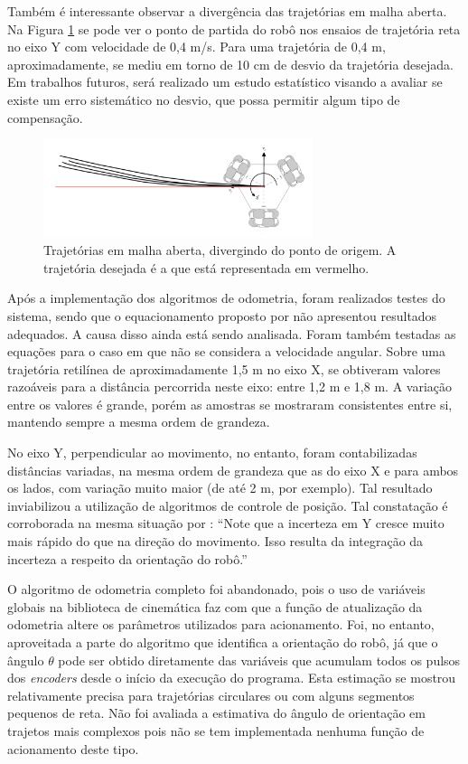 Também é interessante observar a divergência das trajetórias em malha aberta. Na Figura \ref{fig:traj_y} se pode ver o ponto de partida do robô nos ensaios de trajetória reta no eixo Y com velocidade de 0,4 m/s. Para uma trajetória de 0,4 m, aproximadamente, se mediu em torno de 10 cm de desvio da trajetória desejada. Em trabalhos futuros, será realizado um estudo estatístico visando a avaliar se existe um erro sistemático no desvio, que possa permitir algum tipo de compensação.

\begin{figure}[h]
  \centering
  \includegraphics[width = 0.7\textwidth]{imagens/traj_y}
  \caption{Trajetórias em malha aberta, divergindo do ponto de origem. A trajetória desejada é a que está representada em vermelho.}
  \label{fig:traj_y}
\end{figure}

Após a implementação dos algoritmos de odometria, foram realizados testes do sistema, sendo que o equacionamento proposto por \citet{lynch2017modern} não apresentou resultados adequados. A causa disso ainda está sendo analisada. Foram também testadas as equações para o caso em que não se considera a velocidade angular. Sobre uma trajetória retilínea de aproximadamente 1,5 m no eixo X, se obtiveram valores razoáveis para a distância percorrida neste eixo: entre 1,2 m e 1,8 m. A variação entre os valores é grande, porém as amostras se mostraram consistentes entre si, mantendo sempre a mesma ordem de grandeza.

No eixo Y, perpendicular ao movimento, no entanto, foram contabilizadas distâncias variadas, na mesma ordem de grandeza que as do eixo X e para ambos os lados, com variação muito maior (de até 2 m, por exemplo). Tal resultado inviabilizou a utilização de algoritmos de controle de posição. Tal constatação é corroborada na mesma situação por \citet{siegwart2011introduction}: ``Note que a incerteza em Y cresce muito mais rápido do que na direção do movimento. Isso resulta da integração da incerteza a respeito da orientação do robô.''

O algoritmo de odometria completo foi abandonado, pois o uso de variáveis globais na biblioteca de cinemática faz com que a função de atualização da odometria altere os parâmetros utilizados para acionamento. Foi, no entanto, aproveitada a parte do algoritmo que identifica a orientação do robô, já que o ângulo $\theta$ pode ser obtido diretamente das variáveis que acumulam todos os pulsos dos \textit{encoders} desde o início da execução do programa. Esta estimação se mostrou relativamente precisa para trajetórias circulares ou com alguns segmentos pequenos de reta. Não foi avaliada a estimativa do ângulo de orientação em trajetos mais complexos pois não se tem implementada nenhuma função de acionamento deste tipo.

